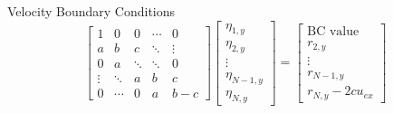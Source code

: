 \begin{frame}[shrink]{Velocity Boundary Conditions}
    $$
        \begin{bmatrix}
            1      & 0      & 0      & \cdots & 0      \\
            a      & b      & c      & \ddots & \vdots \\
            0      & a      & \ddots & \ddots & 0      \\
            \vdots & \ddots & a      & b      & c      \\
            0      & \cdots & 0      & a      & b-c
        \end{bmatrix}
        \begin{bmatrix}
            \eta_{1,y}   \\
            \eta_{2,y}   \\
            \vdots       \\
            \eta_{N-1,y} \\
            \eta_{N,y}
        \end{bmatrix}
        =
        \begin{bmatrix}
            \text{BC value} \\
            r_{2,y}         \\
            \vdots          \\
            r_{N-1,y}       \\
            r_{N,y} - 2 c u_{ex}
        \end{bmatrix}
    $$


\end{frame}

